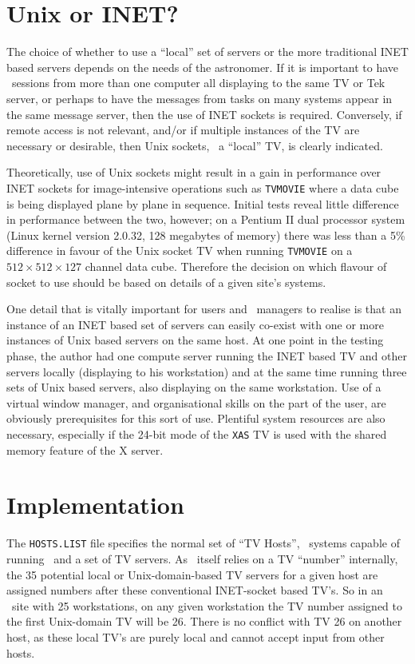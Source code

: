 \section{Unix or INET?}

The choice of whether to use a ``local'' set of servers or the more
traditional INET based servers depends on the needs of the astronomer.
If it is important to have \ttaips\ sessions from more than one computer
all displaying to the same TV or Tek server, or perhaps to have the
messages from tasks on many systems appear in the same message server,
then the use of INET sockets is required.  Conversely, if remote access
is not relevant, and/or if multiple instances of the TV are necessary or
desirable, then Unix sockets, \ie\ a ``local'' TV, is clearly indicated.

Theoretically, use of Unix sockets might result in a gain in performance
over INET sockets for image-intensive operations such as {\tt TVMOVIE}
where a data cube is being displayed plane by plane in sequence.
Initial tests reveal little difference in performance between the two,
however; on a Pentium II dual processor system (Linux kernel version
2.0.32, 128 megabytes of memory) there was less than a 5\% difference in
favour of the Unix socket TV when running {\tt TVMOVIE} on a $512 \times
512 \times 127$ channel data cube.  Therefore the decision on which
flavour of socket to use should be based on details of a given site's
systems.

One detail that is vitally important for users and \AIPS\ managers to
realise is that an instance of an INET based set of servers can easily
co-exist with one or more instances of Unix based servers on the same
host.  At one point in the testing phase, the author had one compute
server running the INET based TV and other servers locally (displaying
to his workstation) and at the same time running three sets of Unix
based servers, also displaying on the same workstation.  Use of a
virtual window manager, and organisational skills on the part of the
user, are obviously prerequisites for this sort of use.  Plentiful
system resources are also necessary, especially if the 24-bit mode of
the {\tt XAS} TV is used with the shared memory feature of the X
server.

\section{Implementation}

The {\tt HOSTS.LIST} file specifies the normal set of ``TV Hosts'',
\ie\  systems capable of running \AIPS\ and a set of TV servers.  As
\AIPS\ itself relies on a TV ``number'' internally, the 35 potential
local or Unix-domain-based TV servers for a given host are assigned
numbers after these conventional INET-socket based TV's.  So in an
\AIPS\ site with 25 workstations, on any given workstation the TV number
assigned to the first Unix-domain TV will be 26.  There is no conflict
with TV 26 on another host, as these local TV's are purely local and
cannot accept input from other hosts.

